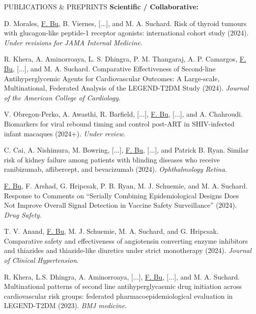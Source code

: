 \documentclass{resume} %
\newcommand{\myName}[1]{\underline{#1}}
\begin{document}
\begin{rSection}{PUBLICATIONS \& PREPRINTS}
\newpage 
\hspace{-.2in} \textbf{Scientific / Collaborative:}

% 

D. Morales, \myName{F. Bu}, B. Viernes, [...], and M. A. Suchard. Risk of thyroid tumours with glucagon-like peptide-1 receptor agonists: international cohort study (2024). \emph{Under revisions for JAMA Internal Medicine.} 

\smallskip 

R. Khera, A. Aminorroaya, L. S. Dhingra, P. M.  Thangaraj, A. P. Camargos, \myName{F. Bu}, [...], and M. A. Suchard. Comparative Effectiveness of Second-line Antihyperglycemic Agents for Cardiovascular Outcomes: A Large-scale, Multinational, Federated Analysis of the LEGEND-T2DM Study (2024). \emph{Journal of the American College of Cardiology}. 

\smallskip 

V. Obregon-Perko, A. Awasthi, R. Barfield, [...], \myName{F. Bu}, [...], and A. Chahroudi. Biomarkers for viral rebound timing and control post-ART in SHIV-infected infant macaques (2024+). \emph{Under review}.

\smallskip 

C. Cai, A. Nishimura, M. Bowring, [...], \myName{F. Bu}, [...], and Patrick B. Ryan. Similar risk of kidney failure among patients with blinding diseases who receive ranibizumab, aflibercept, and bevacizumab (2024). \emph{Ophthalmology Retina}.

\smallskip 

\myName{F. Bu}, F. Arshad, G. Hripcsak, P. B. Ryan, M. J. Schuemie, and M. A. Suchard. Response to Comments on ``Serially Combining Epidemiological Designs Does Not Improve Overall Signal Detection in Vaccine Safety Surveillance'' (2024). \emph{Drug Safety}. 

\smallskip 

T. V. Anand, \myName{F. Bu}, M. J. Schuemie, M. A. Suchard, and G. Hripcsak. Comparative safety and effectiveness of angiotensin converting enzyme inhibitors and thiazides and thiazide-like diuretics under strict monotherapy (2024).  \emph{Journal of Clinical Hypertension}.

\smallskip 

R. Khera, L.S. Dhingra, A. Aminorroaya, [...], \myName{F. Bu}, [...], and  M. A. Suchard.  Multinational patterns of second line antihyperglycaemic drug initiation across cardiovascular risk groups: federated pharmacoepidemiological evaluation in LEGEND-T2DM (2023). \emph{BMJ medicine}. 


\end{rSection}
\end{document}
